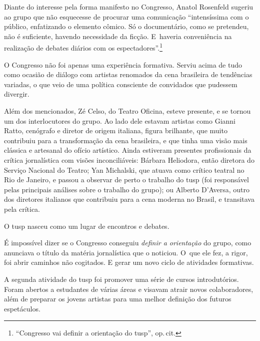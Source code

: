 Diante do interesse pela forma manifesto no Congresso, Anatol Rosenfeld
sugeriu ao grupo que não esquecesse de procurar uma comunicação
“intensíssima com o público, enfatizando o elemento cômico. Só o
documentário, como se pretendeu, não é suficiente, havendo necessidade
da ficção. E~haveria conveniência na realização de debates diários com
os espectadores”.\footnote{“Congresso vai definir a orientação do {\sc tusp}”,
  op.\,cit.}


O Congresso não foi apenas uma experiência formativa. Serviu acima de
tudo como ocasião de diálogo com artistas renomados da cena brasileira
de tendências variadas, o que veio de uma política consciente de
convidados que pudessem divergir.

Além dos mencionados, Zé Celso, do Teatro Oficina, esteve presente, e se
tornou um dos interlocutores do grupo. Ao lado dele estavam artistas
como Gianni Ratto, cenógrafo e diretor de origem italiana, figura
brilhante, que muito contribuiu para a transformação da cena brasileira,
e que tinha uma visão mais clássica e artesanal do ofício artístico.
Ainda estiveram presentes profissionais da crítica jornalística com
visões inconciliáveis: Bárbara Heliodora, então diretora do Serviço
Nacional do Teatro; Yan Michalski, que atuava como crítico teatral no Rio
de Janeiro, e passou a observar de perto o trabalho do {\sc tusp} (foi
responsável pelas principais análises sobre o trabalho do grupo); ou
Alberto D'Aversa, outro dos diretores italianos que contribuiu para a
cena moderna no Brasil, e transitava pela crítica.

O {\sc tusp} nasceu como um lugar de encontros e debates.

\subject{Avaliação dos encontros e escolha dos novos estudos}

É impossível dizer se o Congresso conseguiu {\it definir a orientação}
do grupo, como anunciava o título da matéria jornalística que o
noticiou. O~que ele fez, a rigor, foi abrir caminhos não cogitados. E
gerar um novo ciclo de atividades formativas.

A segunda atividade do {\sc tusp} foi promover uma série de cursos
introdutórios. Foram abertos a estudantes de várias áreas e visavam
atrair novos colaboradores, além de preparar os jovens artistas para uma
melhor definição dos futuros espetáculos.


